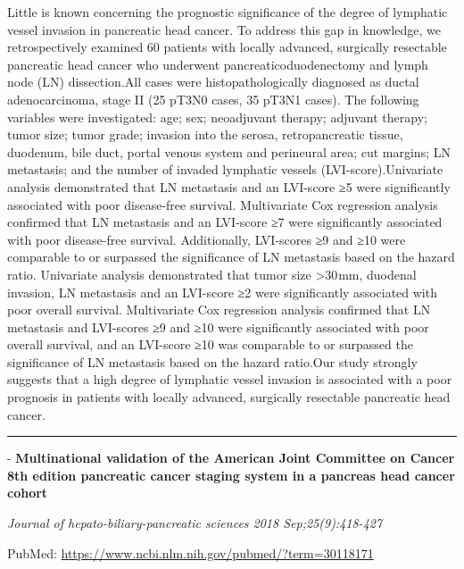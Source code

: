 \documentclass[]{article}
\begin{document}
Little is known concerning the prognostic significance of the degree of
lymphatic vessel invasion in pancreatic head cancer. To address this gap
in knowledge, we retrospectively examined 60 patients with locally
advanced, surgically resectable pancreatic head cancer who underwent
pancreaticoduodenectomy and lymph node (LN) dissection.All cases were
histopathologically diagnosed as ductal adenocarcinoma, stage II (25
pT3N0 cases, 35 pT3N1 cases). The following variables were investigated:
age; sex; neoadjuvant therapy; adjuvant therapy; tumor size; tumor
grade; invasion into the serosa, retropancreatic tissue, duodenum, bile
duct, portal venous system and perineural area; cut margins; LN
metastasis; and the number of invaded lymphatic vessels
(LVI-score).Univariate analysis demonstrated that LN metastasis and an
LVI-score ≥5 were significantly associated with poor disease-free
survival. Multivariate Cox regression analysis confirmed that LN
metastasis and an LVI-score ≥7 were significantly associated with poor
disease-free survival. Additionally, LVI-scores ≥9 and ≥10 were
comparable to or surpassed the significance of LN metastasis based on
the hazard ratio. Univariate analysis demonstrated that tumor size
\textgreater{}30 mm, duodenal invasion, LN metastasis and an LVI-score
≥2 were significantly associated with poor overall survival.
Multivariate Cox regression analysis confirmed that LN metastasis and
LVI-scores ≥9 and ≥10 were significantly associated with poor overall
survival, and an LVI-score ≥10 was comparable to or surpassed the
significance of LN metastasis based on the hazard ratio.Our study
strongly suggests that a high degree of lymphatic vessel invasion is
associated with a poor prognosis in patients with locally advanced,
surgically resectable pancreatic head cancer.

{}

{}

\begin{center}\rule{0.5\linewidth}{\linethickness}\end{center}

 - \textbf{Multinational validation of the American Joint Committee on
Cancer 8th edition pancreatic cancer staging system in a pancreas head
cancer cohort}

\emph{Journal of hepato-biliary-pancreatic sciences 2018
Sep;25(9):418-427}

PubMed: \url{https://www.ncbi.nlm.nih.gov/pubmed/?term=30118171}
\end{document}
